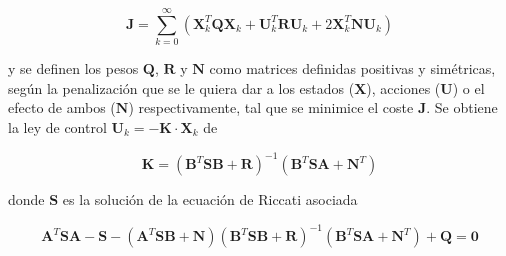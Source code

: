 \documentclass[twoside,11pt]{book}
\begin{document}
\begin{equation}
\mathbf{J} =\sum^{\infty}_{k=0} \left( \mathbf{X}^{T}_{k} \mathbf{Q}\pmb{X}_{k} + \mathbf{U}^{T}_{k} \mathbf{R}\mathbf{U}_{k} + 2\mathbf{X}^{T}_{k} \mathbf{N}\mathbf{U}_{k} \right)
\end{equation}

y se definen los pesos $\mathbf{Q}$, $\mathbf{R}$ y $\mathbf{N}$ como matrices definidas positivas y simétricas, según la penalización que se le quiera dar a los estados ($\mathbf{X}$), acciones ($\mathbf{U}$) o el efecto de ambos ($\mathbf{N}$) respectivamente, tal que se minimice el coste $\mathbf{J}$. Se obtiene la ley de control $\mathbf{U}_{k}=-\mathbf{K} \cdot \mathbf{X}_{k}$ de 


\begin{equation}
\mathbf{K}=(\mathbf{B}^{T}\mathbf{S}\mathbf{B}+\mathbf{R})^{-1}(\mathbf{B}^{T}\mathbf{S}\mathbf{A}+\mathbf{N}^{T})
\end{equation}

donde $\mathbf{S}$ es la solución de la ecuación de Riccati asociada 


\begin{equation}
\mathbf{A}^{T}\mathbf{S}\mathbf{A}-\mathbf{S}-(\mathbf{A}^{T}\mathbf{S}\mathbf{B}+\mathbf{N})(\mathbf{B}^{T}\mathbf{S}\mathbf{B}+\mathbf{R})^{-1}(\mathbf{B}^{T}\mathbf{S}\mathbf{A}+\mathbf{N}^{T})+\mathbf{Q}=\mathbf{0}
\end{equation}




\end{document}
